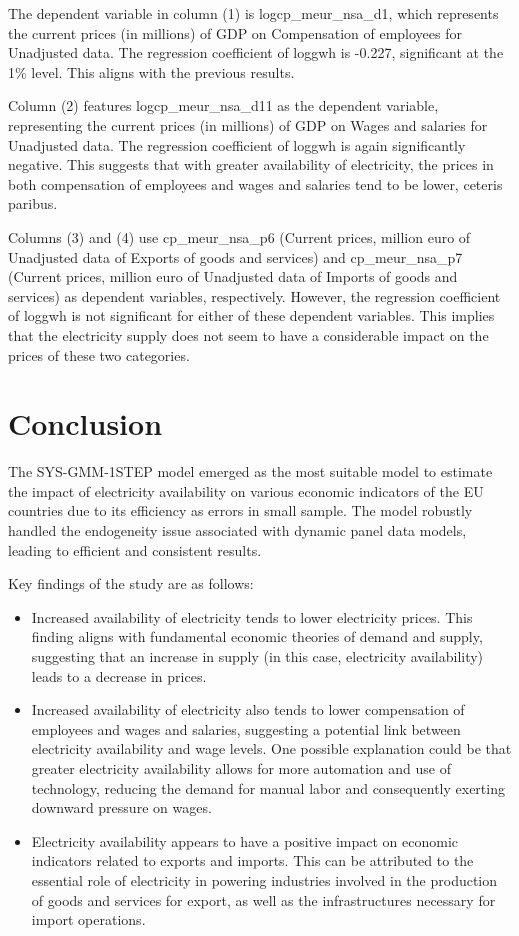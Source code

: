 \documentclass[12pt]{article}
\begin{document}
The dependent variable in column (1) is logcp\_meur\_nsa\_d1, which represents the current prices (in millions) of GDP on Compensation of employees for Unadjusted data. The regression coefficient of loggwh is -0.227, significant at the 1\% level. This aligns with the previous results.

Column (2) features logcp\_meur\_nsa\_d11 as the dependent variable, representing the current prices (in millions) of GDP on Wages and salaries for Unadjusted data. The regression coefficient of loggwh is again significantly negative. This suggests that with greater availability of electricity, the prices in both compensation of employees and wages and salaries tend to be lower, ceteris paribus.

Columns (3) and (4) use cp\_meur\_nsa\_p6 (Current prices, million euro of Unadjusted data of Exports of goods and services) and cp\_meur\_nsa\_p7 (Current prices, million euro of Unadjusted data of Imports of goods and services) as dependent variables, respectively. However, the regression coefficient of loggwh is not significant for either of these dependent variables. This implies that the electricity supply does not seem to have a considerable impact on the prices of these two categories.

\section{Conclusion}
The SYS-GMM-1STEP model emerged as the most suitable model to estimate the impact of electricity availability on various economic indicators of the EU countries due to its efficiency as errors in small sample. The model robustly handled the endogeneity issue associated with dynamic panel data models, leading to efficient and consistent results.

Key findings of the study are as follows:
\begin{itemize}
\item Increased availability of electricity tends to lower electricity prices. This finding aligns with fundamental economic theories of demand and supply, suggesting that an increase in supply (in this case, electricity availability) leads to a decrease in prices.
\item Increased availability of electricity also tends to lower compensation of employees and wages and salaries, suggesting a potential link between electricity availability and wage levels. One possible explanation could be that greater electricity availability allows for more automation and use of technology, reducing the demand for manual labor and consequently exerting downward pressure on wages.
\item Electricity availability appears to have a positive impact on economic indicators related to exports and imports. This can be attributed to the essential role of electricity in powering industries involved in the production of goods and services for export, as well as the infrastructures necessary for import operations.
\end{itemize}
\end{document}
